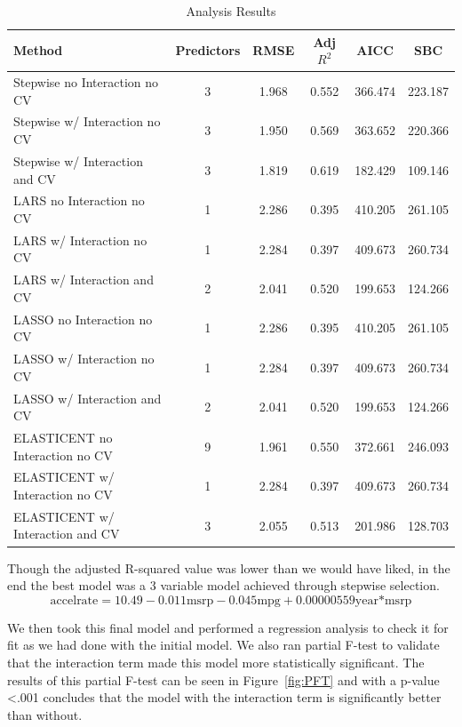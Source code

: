 \documentclass[acmsmall]{acmart}
\begin{document}
\begin{table}[H]
\centering
\begin{tabular}{|l|c|c|c|c|c|}
\hline
\rowcolor{lightgray}
\textbf{Method} & \textbf{Predictors} & \textbf{RMSE} & \textbf{Adj $R^2$} & \textbf{AICC} & \textbf{SBC}\\
\hline
Stepwise no Interaction no CV & 3 & 1.968 & 0.552 & 366.474 & 223.187\\
\hline
Stepwise w/ Interaction no CV & 3 & 1.950 & 0.569 & 363.652 & 220.366\\
\hline
\rowcolor{yellow}
Stepwise w/ Interaction and CV & 3 & 1.819 & 0.619 & 182.429 & 109.146\\
\hline
LARS no Interaction no CV & 1 & 2.286 & 0.395 & 410.205 & 261.105\\
\hline
LARS w/ Interaction no CV & 1 & 2.284 & 0.397 & 409.673 & 260.734\\
\hline
LARS w/ Interaction and CV & 2 & 2.041 & 0.520 & 199.653 & 124.266\\
\hline
LASSO no Interaction no CV & 1 & 2.286 & 0.395 & 410.205 & 261.105\\
\hline
LASSO w/ Interaction no CV & 1 & 2.284 & 0.397 & 409.673 & 260.734\\
\hline
LASSO w/ Interaction and CV & 2 & 2.041 & 0.520 & 199.653 & 124.266\\
\hline
ELASTICENT no Interaction no CV & 9 & 1.961 & 0.550 & 372.661 & 246.093\\
\hline
ELASTICENT w/ Interaction no CV & 1 & 2.284 & 0.397 & 409.673 & 260.734\\
\hline
ELASTICENT w/ Interaction and CV & 3 & 2.055 & 0.513 & 201.986 & 128.703\\
\hline
\end{tabular}
\caption{Analysis Results}
\label{tab:CCM}
\end{table}

Though the adjusted R-squared value was lower than we would have liked, in the end the best model was a 3 variable model achieved through stepwise selection.\\
$$ \text{accelrate} = 10.49 - 0.011 \text{msrp} - 0.045 \text{mpg} + 0.00000559 \text{year*msrp}$$

We then took this final model and performed a regression analysis to check it for fit as we had done with the initial model. We also ran  partial F-test to validate that the interaction term made this model more statistically significant. The results of this partial F-test can be seen in Figure~\ref{fig:PFT} and with a p-value <.001 concludes that the model with the interaction term is significantly better than without.
\end{document}
